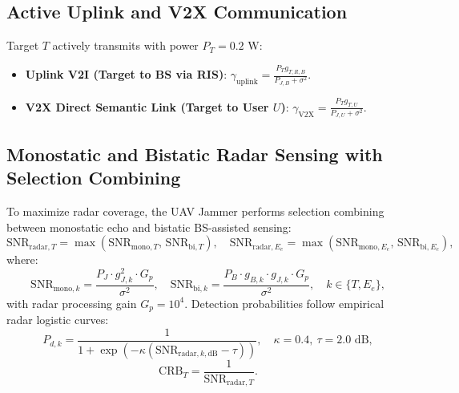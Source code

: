 \documentclass[journal,onecolumn]{IEEEtran}
\begin{document}
\subsection{Active Uplink and V2X Communication}
Target $T$ actively transmits with power $P_T = 0.2\text{ W}$:
\begin{itemize}
    \item \textbf{Uplink V2I (Target to BS via RIS)}: $\gamma_{\text{uplink}} = \frac{P_T g_{T, R, B}}{P_{J, B} + \sigma^2}$.
    \item \textbf{V2X Direct Semantic Link (Target to User $U$)}: $\gamma_{\text{V2X}} = \frac{P_T g_{T, U}}{P_{J, U} + \sigma^2}$.
\end{itemize}

\subsection{Monostatic and Bistatic Radar Sensing with Selection Combining}
To maximize radar coverage, the UAV Jammer performs selection combining between monostatic echo and bistatic BS-assisted sensing:
\begin{equation}
    \text{SNR}_{\text{radar}, T} = \max\left( \text{SNR}_{\text{mono}, T},\, \text{SNR}_{\text{bi}, T} \right), \quad
    \text{SNR}_{\text{radar}, E_e} = \max\left( \text{SNR}_{\text{mono}, E_e},\, \text{SNR}_{\text{bi}, E_e} \right),
\end{equation}
where:
\begin{equation}
    \text{SNR}_{\text{mono}, k} = \frac{P_{J} \cdot g_{J,k}^2 \cdot G_p}{\sigma^2}, \quad
    \text{SNR}_{\text{bi}, k} = \frac{P_B \cdot g_{B, k} \cdot g_{J, k} \cdot G_p}{\sigma^2}, \quad k \in \{T, E_e\},
\end{equation}
with radar processing gain $G_p = 10^4$. Detection probabilities follow empirical radar logistic curves:
\begin{equation}
    P_{d, k} = \frac{1}{1 + \exp\left( -\kappa (\text{SNR}_{\text{radar}, k, \text{dB}} - \tau) \right)}, \quad \kappa = 0.4, \ \tau = 2.0\text{ dB},
\end{equation}
\begin{equation}
    \text{CRB}_T = \frac{1}{\text{SNR}_{\text{radar}, T}}.
\end{equation}
\end{document}

